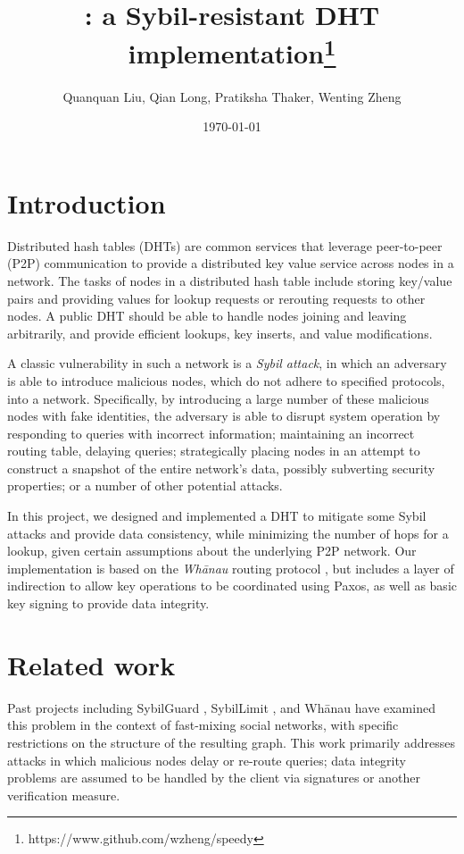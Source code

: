 \documentclass[letter]{article}
\title{\sys: a Sybil-resistant DHT implementation\footnote{https://www.github.com/wzheng/speedy}}
\author{Quanquan Liu, Qian Long, Pratiksha Thaker, Wenting Zheng}
\date{\today}
\begin{document}
\maketitle

\section{Introduction}

Distributed hash tables (DHTs) are common services that leverage peer-to-peer
(P2P) communication to provide a distributed key value service across nodes in a
network. The tasks of nodes in a distributed hash table include storing
key/value pairs and providing values for lookup requests or rerouting requests
to other nodes. A public DHT should be able to handle nodes joining and leaving
arbitrarily, and provide efficient lookups, key inserts, and value
modifications.

A classic vulnerability in such a network is a \textit{Sybil attack}, in
which an adversary is able to introduce malicious nodes, which
do not adhere to specified
protocols, into a network. Specifically,
by introducing a large number of these malicious nodes with fake identities,
the adversary is able to
disrupt system operation by responding to queries with incorrect information;
maintaining an incorrect routing table, delaying queries;
strategically placing nodes in an attempt to construct a snapshot of the
entire network's data, possibly subverting security properties; or a
number of other potential attacks.

In this project, we designed and implemented a DHT to mitigate some
Sybil attacks and provide data consistency, while minimizing the number of hops
for a lookup, given certain assumptions about the underlying P2P network.
Our implementation is based on the \textit{Wh\={a}nau} routing protocol
\cite{whanau}, but includes a layer of indirection to allow key operations
to be coordinated using Paxos, as well as basic key signing to provide
data integrity.

\section{Related work}

Past projects including SybilGuard \cite{sybilguard}, SybilLimit \cite{sybillimit},
and Wh\={a}nau \cite{whanau} have examined this problem in the context
of fast-mixing social networks, with specific restrictions on the
structure of the resulting graph. This work primarily addresses attacks
in which malicious nodes delay or re-route queries; data integrity
problems are assumed to be handled by the client via signatures or another
verification measure.\\
\end{document}
